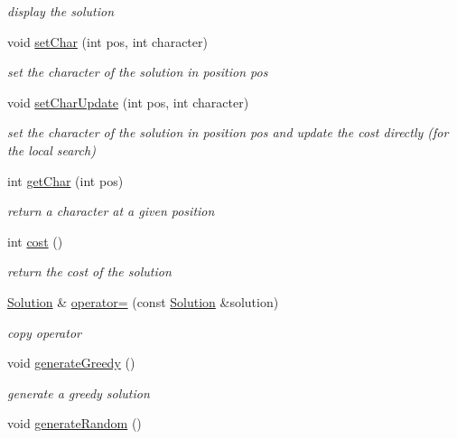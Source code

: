 \begin{DoxyCompactItemize}
\begin{DoxyCompactList}\small\item\em display the solution \end{DoxyCompactList}\item 
void \hyperlink{classSolution_a2710e3de9dc541b3bee1e8d20ef6c05f}{set\+Char} (int pos, int character)
\begin{DoxyCompactList}\small\item\em set the character of the solution in position pos \end{DoxyCompactList}\item 
void \hyperlink{classSolution_ae39f3ff67a3c60fe069c1e1a379da4f2}{set\+Char\+Update} (int pos, int character)
\begin{DoxyCompactList}\small\item\em set the character of the solution in position pos and update the cost directly (for the local search) \end{DoxyCompactList}\item 
int \hyperlink{classSolution_a05ad223fd0a27d13647ca4683dc6017e}{get\+Char} (int pos)
\begin{DoxyCompactList}\small\item\em return a character at a given position \end{DoxyCompactList}\item 
int \hyperlink{classSolution_ac11feb04b156f545c83575ccbdf0b844}{cost} ()
\begin{DoxyCompactList}\small\item\em return the cost of the solution \end{DoxyCompactList}\item 
\hyperlink{classSolution}{Solution} \& \hyperlink{classSolution_a9eb108a1a1e74cd5fb4b30c341010a8e}{operator=} (const \hyperlink{classSolution}{Solution} \&solution)
\begin{DoxyCompactList}\small\item\em copy operator \end{DoxyCompactList}\item 
void \hyperlink{classSolution_a6597654674460f88d6486a82946cc6a8}{generate\+Greedy} ()\hypertarget{classSolution_a6597654674460f88d6486a82946cc6a8}{}\label{classSolution_a6597654674460f88d6486a82946cc6a8}

\begin{DoxyCompactList}\small\item\em generate a greedy solution \end{DoxyCompactList}\item 
void \hyperlink{classSolution_ac587e2dcb9dff4d09c32292c5fb0b378}{generate\+Random} ()\hypertarget{classSolution_ac587e2dcb9dff4d09c32292c5fb0b378}{}\label{classSolution_ac587e2dcb9dff4d09c32292c5fb0b378}


\end{DoxyCompactItemize}
